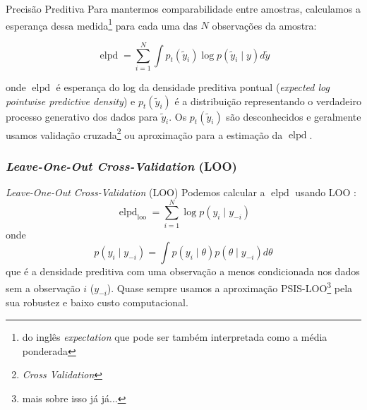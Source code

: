 \begin{frame}{Precisão Preditiva}
	Para mantermos comparabilidade entre amostras, calculamos a
	esperança dessa medida\footnote{do inglês \textit{expectation} que pode ser
		também interpretada como a média ponderada} para cada uma das $N$ observações
	da amostra:

	$$
		\operatorname{elpd} = \sum_{i=1}^N \int p_t(\tilde{y}_i) \log p(\tilde{y}_i \mid y) d \tilde{y}
	$$

	onde $\operatorname{elpd}$ é esperança do log da densidade preditiva pontual
	(\textit{expected log pointwise predictive density}) e
	$p_t(\tilde{y}_i)$ é a distribuição representando o verdadeiro processo
	generativo dos dados para $\tilde{y}_i$.
	Os $p_t(\tilde{y}_i)$ são desconhecidos e geralmente usamos validação
	cruzada\footnote{\textit{Cross Validation}} ou aproximação para
	a estimação da $\operatorname{elpd}$.
\end{frame}

\subsubsection{\textit{Leave-One-Out Cross-Validation} (LOO)}
\begin{frame}{\textit{Leave-One-Out Cross-Validation} (LOO)}
	Podemos calcular a $\operatorname{elpd}$ usando LOO
	\parencite{vehtariPracticalBayesianModel2015}:
	$$
		\operatorname{elpd}_{\text{loo}} = \sum_{i=1}^N \log p(y_i \mid y_{-i})
	$$
	onde
	$$
		p(y_i \mid y_{-i}) = \int p(y_i \mid \theta) p(\theta \mid y_{-i}) d \theta
	$$
	que é a densidade preditiva com uma observação a menos condicionada nos
	dados sem a observação $i$ ($y_{-i}$). Quase sempre usamos a aproximação
	PSIS-LOO\footnote{mais sobre isso já já...} pela sua robustez e baixo custo
	computacional.
\end{frame}

